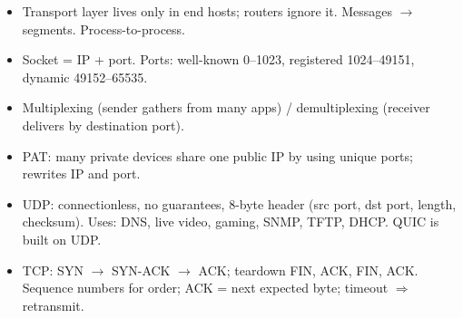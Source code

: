 \begin{recap}
\begin{itemize}
  \item Transport layer lives only in end hosts; routers ignore it. Messages $\to$ segments. Process-to-process.
  \item Socket = IP + port. Ports: well-known 0--1023, registered 1024--49151, dynamic 49152--65535.
  \item Multiplexing (sender gathers from many apps) / demultiplexing (receiver delivers by destination port).
  \item PAT: many private devices share one public IP by using unique ports; rewrites IP and port.
  \item UDP: connectionless, no guarantees, 8-byte header (src port, dst port, length, checksum). Uses: DNS, live video, gaming, SNMP, TFTP, DHCP. QUIC is built on UDP.
  \item TCP: SYN $\to$ SYN-ACK $\to$ ACK; teardown FIN, ACK, FIN, ACK. Sequence numbers for order; ACK = next expected byte; timeout $\Rightarrow$ retransmit.
\end{itemize}
\end{recap}
